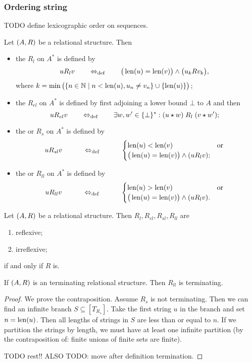 \subsubsection{Ordering string}
TODO define lexicographic order on sequences.

\begin{definition}
Let $\sSet{A,R}$ be a relational structure. Then
\begin{itemize}
\item the  $R_l$ on $A^*$ is defined by
\[ u R_l v \quad\quad\Leftrightarrow_{\text{def}}\quad\quad \big(\operatorname{len}(u) = \operatorname{len}(v)\big) \land \big(u_k R v_k\big), \]
where $k = \min\big(\setbuilder{n\in\N}{n < \len(u), u_n \neq v_n}\cup\{\len(u)\}\big)$;
\item the  $R_{el}$ on $A^*$ is defined by first adjoining a lower bound $\bot$ to $A$ and then
\[ u R_{el} v \quad\quad\Leftrightarrow_{\text{def}}\quad\quad \exists w,w'\in \{\bot\}^*: (u\star w) \mathrel{R_l} (v\star w'); \]
\item the  or  $R_{s}$ on $A^*$ is defined by
\[ u R_{sl} v \qquad\quad\Leftrightarrow_{\text{def}}\quad\qquad \begin{cases}
\operatorname{len}(u) < \operatorname{len}(v) & \text{or} \\
\big(\operatorname{len}(u) = \operatorname{len}(v)\big) \land (u R_l v);
\end{cases}\]
\item the  or $R_{ll}$ on $A^*$ is defined by
\[ u R_{ll} v \qquad\quad\Leftrightarrow_{\text{def}}\quad\qquad \begin{cases}
\operatorname{len}(u) > \operatorname{len}(v) & \text{or} \\
\big(\operatorname{len}(u) = \operatorname{len}(v)\big) \land (u R_l v).
\end{cases}\]
\end{itemize}
\end{definition}

\begin{lemma}
Let $\sSet{A,R}$ be a relational structure. Then $R_l, R_{el}, R_{sl}, R_{ll}$ are
\begin{enumerate}
\item reflexive;
\item irreflexive;
\end{enumerate}
\textup{if and only if} $R$ is.
\end{lemma}

\begin{proposition}
If $\sSet{A,R}$ is an terminating relational structure. Then $R_{ll}$ is terminating.
\end{proposition}
\begin{proof}
We prove the contraposition. Assume $R_s$ is not terminating. Then we can find an infinite branch $S\subseteq [T_{R_s}]$. Take the first string $u$ in the branch and set $n = \operatorname{len}(u)$. Then all lengths of strings in $S$ are less than or equal to $n$. If we partition the strings by length, we must have at least one infinite partition (by the contraposition of: finite unions of finite sets are finite).

TODO rest!! ALSO TODO: move after definition termination.
\end{proof}

